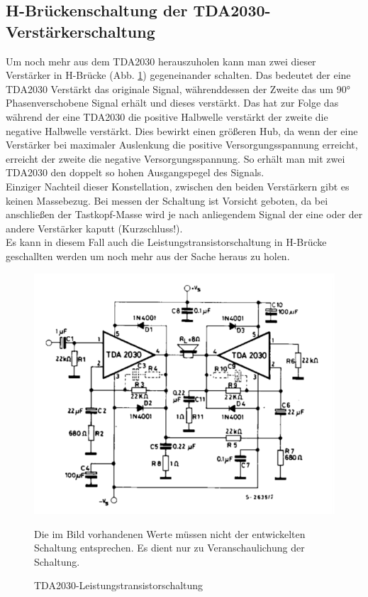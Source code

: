 \subsection{H-Brückenschaltung der TDA2030-Verstärkerschaltung}\label{subsec3.2.4}
Um noch mehr aus dem TDA2030 herauszuholen kann man zwei dieser Verstärker in H-Brücke (Abb. \ref{fig:3.2.4.1}) gegeneinander schalten. Das bedeutet der eine TDA2030 Verstärkt das originale Signal, währenddessen der Zweite das um 90° Phasenverschobene Signal erhält und dieses verstärkt. Das hat zur Folge das während der eine TDA2030 die positive Halbwelle verstärkt der zweite die negative Halbwelle verstärkt. Dies bewirkt einen größeren Hub, da wenn der eine Verstärker bei maximaler Auslenkung die positive Versorgungsspannung erreicht, erreicht der zweite die negative Versorgungsspannung. So erhält man mit zwei TDA2030 den doppelt so hohen Ausgangspegel des Signals.\\
Einziger Nachteil dieser Konstellation, zwischen den beiden Verstärkern gibt es keinen Massebezug. Bei messen der Schaltung ist Vorsicht geboten, da bei anschließen der Tastkopf-Masse wird je nach anliegendem Signal der eine oder der andere Verstärker kaputt (Kurzschluss!).\\
Es kann in diesem Fall auch die Leistungstransistorschaltung in H-Brücke geschallten werden um noch mehr aus der Sache heraus zu holen.
\begin{figure} [H]
	\centering
	\includegraphics[width=1\textwidth]{img/Grundlagen/TDA2030/TDA2030-H-Bruecke.PNG}
	\caption{TDA2030-Leistungstransistorschaltung}
	\text Die im Bild vorhandenen Werte müssen nicht der entwickelten Schaltung entsprechen. Es dient nur zu Veranschaulichung der Schaltung.
	\label {fig:3.2.4.1}
\end{figure}


